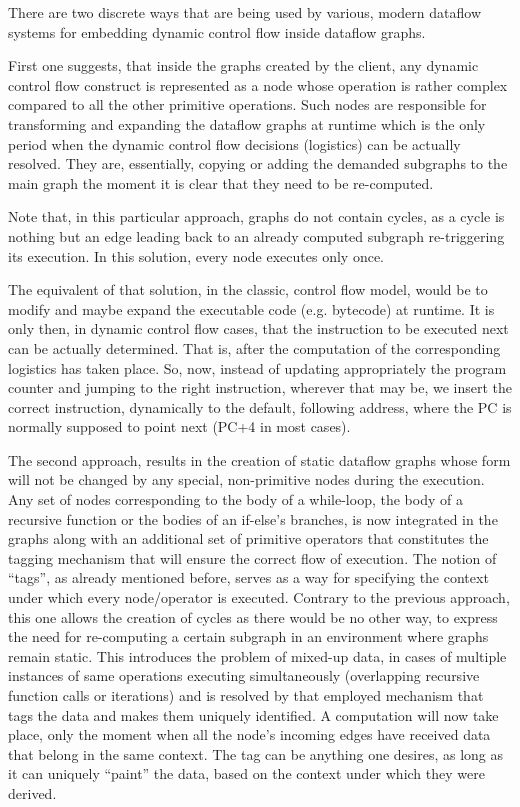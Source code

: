 \documentclass[ack,preface]{dithesis}
\begin{document}
There are two discrete ways that are being used by various, modern dataflow systems for embedding dynamic control flow inside dataflow graphs. 

First one suggests, that inside the graphs created by the client, any dynamic control flow construct is represented as a node whose operation is rather complex compared to all the other primitive operations. Such nodes are responsible for transforming and expanding the dataflow graphs at runtime which is the only period when the dynamic control flow decisions (logistics) can be actually resolved. They are, essentially, copying or adding the demanded subgraphs to the main graph the moment it is clear that they need to be re-computed.

Note that, in this particular approach, graphs do not contain cycles, as a cycle is nothing but an edge leading back to an already computed subgraph re-triggering its execution. In this solution, every node executes only once.

The equivalent of that solution, in the classic, control flow model, would be to modify and maybe expand the executable code (e.g. bytecode) at runtime. It is only then, in dynamic control flow cases, that the instruction to be executed next can be actually determined. That is, after the computation of the corresponding logistics has taken place. So, now, instead of updating appropriately the program counter and jumping to the right instruction, wherever that may be, we insert the correct instruction, dynamically to the default, following address, where the PC is normally supposed to point next (PC+4 in most cases).

The second approach, results in the creation of static dataflow graphs whose form will not be changed by any special, non-primitive nodes during the execution. Any set of nodes corresponding to the body of a while-loop, the body of a recursive function or the bodies of an if-else’s branches, is now integrated in the graphs along with an additional set of primitive operators that constitutes the tagging mechanism that will ensure the correct flow of execution. The notion of “tags”, as already mentioned before, serves as a way for specifying the context under which every node/operator is executed. Contrary to the previous approach, this one allows the creation of cycles as there would be no other way, to express the need for re-computing a certain subgraph in an environment where graphs remain static. This introduces the problem of mixed-up data, in cases of multiple instances of same operations executing simultaneously (overlapping recursive function calls or iterations) and is resolved by that employed mechanism that tags the data and makes them uniquely identified. A computation will now take place, only the moment when all the node’s incoming edges have received data that belong in the same context. The tag can be anything one desires, as long as it can uniquely “paint” the data, based on the context under which they were derived.
\end{document}
